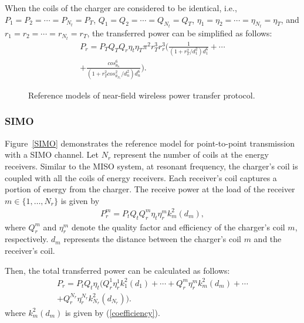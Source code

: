 \documentclass[twocolumn,10pt]{IEEEtran}
\begin{document}
When the coils of the charger are considered to be identical, i.e., $P_{1}=P_{2}=\cdots=P_{N_{t}}=P_{T}$, $Q_{1}=Q_{2}=\cdots=Q_{N_{t}}=Q_{T}$, $\eta_{1}=\eta_{2}=\cdots=\eta_{N_{t}}=\eta_{T}$, and $r_{1}=r_{2}=\cdots=r_{N_{t}}=r_{T}$, the transferred power can be simplified as follows:
\begin{eqnarray}
P_{r}=P_{T}Q_{T}Q_{r}\eta_{t}\eta_{T}\pi^{2} r^{3}_{T} r^{3}_{r} 
\Bigg( \frac{1}{(1+r^{2}_{T}/d_{1}^{2})d_{1}^{6}} 
+ \cdots \nonumber  \\
 + \frac{cos^{6}_{\theta_{n}}}{(1+r^{2}_{T}cos^{2}_{\theta_{N_{t}}}/d^{2}_{n})d^{6}_{n}}	\Bigg)	.
\end{eqnarray}


 
\begin{figure*} 
\centering
{}  
 \centering
  \centering
\caption{Reference models of near-field wireless power transfer protocol.} 
\label{WPT}
\end{figure*}  

\subsubsection{SIMO}
Figure~\ref{SIMO} demonstrates the reference model for point-to-point transmission with a SIMO channel. Let $N_{r}$ represent the number of coils at the energy receivers. Similar to the MISO system, at resonant frequency, the charger's coil is coupled with all the coils of energy receivers. Each receiver's coil captures a portion of energy from the charger. The receive power at the load of the receiver $m \in \{1,\ldots,N_{r}\}$ is given by
\begin{eqnarray}
P^{m}_{r}= P_{t} Q_{t} Q^{m}_{r} \eta_{t} \eta^{m}_{r} k^{2}_{m}(d_{m})	,
\end{eqnarray}
where $Q^{m}_{r}$ and $\eta^{m}_{r}$ denote the quality factor and efficiency of the charger's coil $m$, respectively. $d_{m}$ represents the distance between the charger's coil $m$ and the receiver's coil. 


Then, the total transferred power can be calculated as follows:
\begin{eqnarray}
P_{r}= P_{t} Q_{t} \eta_{t}  \big (  Q^{1}_{r} \eta^{1}_{r} k^{2}_{1}(d_{1})+\cdots +  Q^{m}_{r} \eta^{m}_{r} k^{2}_{m}(d_{m})+\cdots \nonumber \\ 
 +  Q^{N_{r}}_{r} \eta^{N_{r}}_{r} k^{2}_{N_{r}}(d_{N_{r}}) \big).
\end{eqnarray}
where $k^{2}_{m}(d_{m})$ is given by (\ref{coefficiency}). 
 
\end{document}
